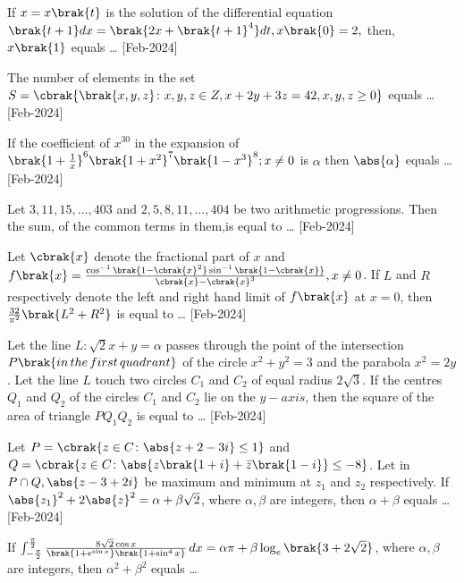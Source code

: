 \iffalse
    \title{2024}
    \author{EE24BTECH11021}
    \section{integer}
\fi
    \item If $x=x\brak{t}$ is the solution of the differential equation\\
    $\brak{t+1}dx=\brak{2x+\brak{t+1}^4}dt,x\brak{0}=2,$ then, $x\brak{1}$ equals \dots
    \hfill{[Feb-2024]}
    \item The number of elements in the set\\
            $S=\cbrak{\brak{x,y,z}\colon x,y,z\in Z,x+2y+3z=42,x,y,z\geq0}$ equals \dots
            \hfill{[Feb-2024]}
    \item If the coefficient of $x^{30}$ in the expansion of $\brak{1+\frac{1}{x}}^6\brak{1+x^2}^7\brak{1-x^3}^8;x\neq0$ is $\alpha$ then $\abs{\alpha}$ equals \dots
    \hfill{[Feb-2024]}
    \item Let $3,11,15,\dots,403$ and $2,5,8,11,\dots,404$ be two arithmetic progressions. Then the sum, of the common terms in them,is equal to \dots
    \hfill{[Feb-2024]}
    \item Let $\cbrak{x}$ denote the fractional part of $x$ and $f\brak{x}=\frac{\cos^{-1}\brak{1-\cbrak{x}^2}\sin^{-1}\brak{1-\cbrak{x}}}{\cbrak{x}-\cbrak{x}^3},x\neq0$. If $L$ and $R$ respectively denote the left and right hand limit of $f\brak{x}$ at $x=0$, then $\frac{32}{\pi^2}\brak{L^2+R^2}$ is equal to \dots
    \hfill{[Feb-2024]}
    \item Let the line $L\colon\sqrt{2}x+y=\alpha$ passes through the point of the intersection $P\brak{in\,the\,first\,quadrant}$ of the circle $x^2+y^2=3$ and the parabola $x^2=2y$. Let the line $L$ touch two circles $C_1$ and $C_2$ of equal radius $2\sqrt{3}$. If the centres $Q_1$ and $Q_2$ of the circles $C_1$ and $C_2$ lie on the $y-axis$, then the square of the area of triangle $PQ_1Q_2$ is equal to \dots 
    \hfill{[Feb-2024]}
    \item Let $P=\cbrak{z\in C\colon\abs{z+2-3i}\leq 1}$ and $Q=\cbrak{z\in C\colon\abs{z\brak{1+i}+\Bar{z}\brak{1-i}}\leq -8}$. Let in $P\cap Q,\abs{z-3+2i}$ be maximum and minimum at $z_1$ and $z_2$ respectively. If $\abs{z_1}^2+2\abs{z}^2=\alpha+\beta\sqrt{2}$, where $\alpha,\beta$ are integers, then $\alpha+\beta$ equals \dots
    \hfill{[Feb-2024]}
    \item If $\int_{-\frac{\pi}{2}}^{\frac{\pi}{2}}\frac{8\sqrt{2}\cos{x}}{\brak{1+e^{\sin{x}}}\brak{1+\sin^4{x}}} \, dx=\alpha\pi+\beta\log_{e}\brak{3+2\sqrt{2}}$, where $\alpha,\beta$ are integers, then $\alpha^2+\beta^2$ equals \dots

